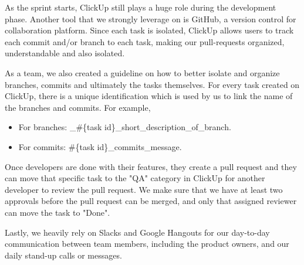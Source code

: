 As the sprint starts, ClickUp still plays a huge role during the development phase. Another tool that we strongly leverage on is GitHub, a version control for collaboration platform. Since each task is isolated, ClickUp allows users to track each commit and/or branch to each task, making our pull-requests organized, understandable and also isolated.

As a team, we also created a guideline on how to better isolate and organize branches, commits and ultimately the tasks themselves. For every task created on ClickUp, there is a unique identification which is used by us to link the name of the branches and commits. For example,

\begin{itemize}
\item For branches: \_\#\{task id\}\_short\_description\_of\_branch.
\item For commits: \#\{task id\}\_commits\_message.
\end{itemize}


Once developers are done with their features, they create a pull request and they can move that specific task to the "QA" category in ClickUp for another developer to review the pull request. We make sure that we have at least two approvals before the pull request can be merged, and only that assigned reviewer can move the task to "Done".

Lastly, we heavily rely on Slacks and Google Hangouts for our day-to-day communication between team members, including the product owners, and our daily stand-up calls or messages. 

